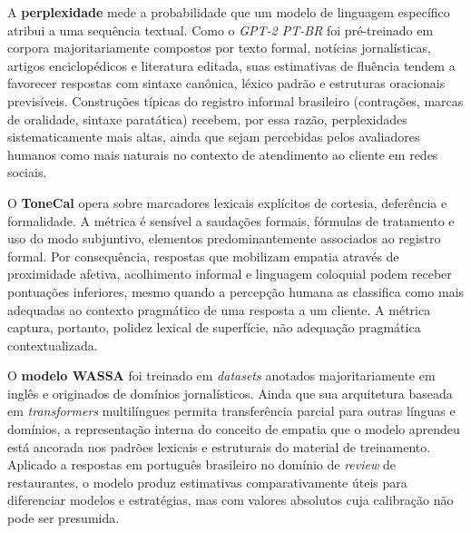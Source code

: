 \documentclass[12pt, a4paper]{article}
\numberwithin{equation}{section}
\begin{document}
A \textbf{perplexidade} mede a probabilidade que um modelo de linguagem específico atribui a uma sequência textual. Como o \textit{GPT-2 PT-BR} foi pré-treinado em corpora majoritariamente compostos por texto formal, notícias jornalísticas, artigos enciclopédicos e literatura editada, suas estimativas de fluência tendem a favorecer respostas com sintaxe canônica, léxico padrão e estruturas oracionais previsíveis. Construções típicas do registro informal brasileiro (contrações, marcas de oralidade, sintaxe paratática) recebem, por essa razão, perplexidades sistematicamente mais altas, ainda que sejam percebidas pelos avaliadores humanos como mais naturais no contexto de atendimento ao cliente em redes sociais.
 
 O \textbf{ToneCal} opera sobre marcadores lexicais explícitos de cortesia, deferência e 
formalidade. A métrica é sensível a saudações formais, fórmulas de tratamento e uso do modo subjuntivo, elementos predominantemente associados ao registro formal. Por consequência, respostas que mobilizam empatia através de proximidade afetiva, acolhimento informal e linguagem coloquial podem receber pontuações inferiores, mesmo quando a percepção humana as classifica como mais adequadas ao contexto pragmático de uma resposta a um cliente. A métrica captura, portanto, polidez lexical de superfície, não adequação pragmática contextualizada.
 
O \textbf{modelo WASSA} foi treinado em \textit{datasets} anotados majoritariamente em inglês e originados de domínios jornalísticos. Ainda que sua arquitetura baseada em \textit{transformers} multilíngues permita transferência parcial para outras línguas e domínios, a representação interna do conceito de empatia que o modelo aprendeu está ancorada nos padrões lexicais e estruturais do material de treinamento. Aplicado a respostas em português brasileiro no domínio de \textit{review} de restaurantes, o modelo produz estimativas comparativamente úteis para diferenciar modelos e estratégias, mas com valores absolutos cuja calibração não pode ser presumida.
\end{document}
